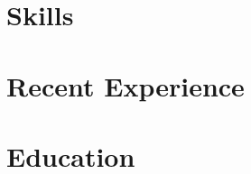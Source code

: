 \documentclass[a4paper,12pt]{article}
\begin{document}


\section{Skills}


\section{Recent Experience}


\section{Education}


\end{document}
